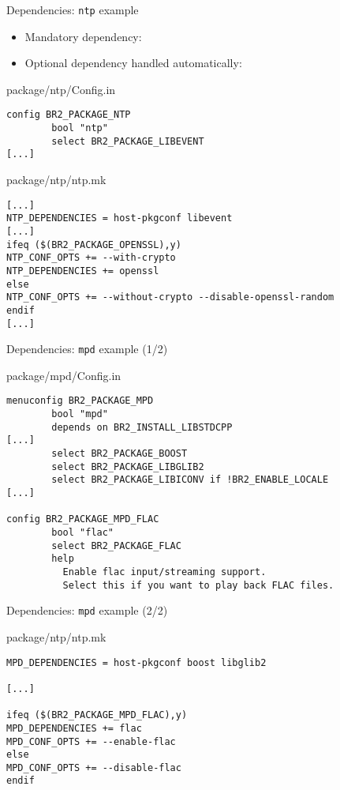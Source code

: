\begin{frame}[fragile]{Dependencies: {\tt ntp} example}

  \begin{itemize}
  \item Mandatory dependency: 
  \item Optional dependency handled automatically: 
  \end{itemize}

\begin{block}{package/ntp/Config.in}
{\scriptsize
\begin{verbatim}
config BR2_PACKAGE_NTP
        bool "ntp"
        select BR2_PACKAGE_LIBEVENT
[...]
\end{verbatim}}
\end{block}

\begin{block}{package/ntp/ntp.mk}
\begin{verbatim}
[...]
NTP_DEPENDENCIES = host-pkgconf libevent
[...]
ifeq ($(BR2_PACKAGE_OPENSSL),y)
NTP_CONF_OPTS += --with-crypto
NTP_DEPENDENCIES += openssl
else
NTP_CONF_OPTS += --without-crypto --disable-openssl-random
endif
[...]
\end{verbatim}
\end{block}

\end{frame}

\begin{frame}[fragile]{Dependencies: {\tt mpd} example (1/2)}

\begin{block}{package/mpd/Config.in}
{\scriptsize
\begin{verbatim}
menuconfig BR2_PACKAGE_MPD
        bool "mpd"
        depends on BR2_INSTALL_LIBSTDCPP
[...]
        select BR2_PACKAGE_BOOST
        select BR2_PACKAGE_LIBGLIB2
        select BR2_PACKAGE_LIBICONV if !BR2_ENABLE_LOCALE
[...]

config BR2_PACKAGE_MPD_FLAC
        bool "flac"
        select BR2_PACKAGE_FLAC
        help
          Enable flac input/streaming support.
          Select this if you want to play back FLAC files.

\end{verbatim}}
\end{block}

\end{frame}

\begin{frame}[fragile]{Dependencies: {\tt mpd} example (2/2)}

\begin{block}{package/ntp/ntp.mk}
\begin{verbatim}
MPD_DEPENDENCIES = host-pkgconf boost libglib2

[...]

ifeq ($(BR2_PACKAGE_MPD_FLAC),y)
MPD_DEPENDENCIES += flac
MPD_CONF_OPTS += --enable-flac
else
MPD_CONF_OPTS += --disable-flac
endif
\end{verbatim}
\end{block}

\end{frame}


